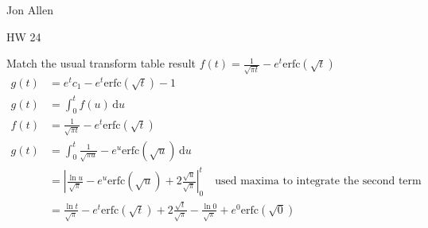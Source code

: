 \documentclass{article}
\begin{document}
Jon Allen

HW 24

Match the usual transform table result $f(t)=\frac{1}{\sqrt{\pi t}}-e^t\text{erfc}\left(\sqrt{t}\right)$
\begin{align*}
  g(t)&=e^tc_1-e^{t}\text{erfc}(\sqrt{t})-1\\
  g(t)&=\int_0^t{f(u)\,\mathrm{d}u}\\
  f(t)&=\frac{1}{\sqrt{\pi t}}-e^t\text{erfc}\left(\sqrt{t}\right)\\
  g(t)&=\int_0^t{\frac{1}{\sqrt{\pi u}}-e^u\text{erfc}\left(\sqrt{u}\right)\,\mathrm{d}u}\\
  &=\left\lvert\frac{\ln u}{\sqrt{\pi}}-e^u\text{erfc}(\sqrt{u})+2\frac{\sqrt{u}}{\sqrt{\pi}}\right\rvert_0^t\quad\text{used maxima to integrate the second term}\\
  &=\frac{\ln t}{\sqrt{\pi}}-e^t\text{erfc}(\sqrt{t})+2\frac{\sqrt{t}}{\sqrt{\pi}}-\frac{\ln 0}{\sqrt{\pi}}+e^0\text{erfc}(\sqrt{0})
\end{align*}
\end{document}
